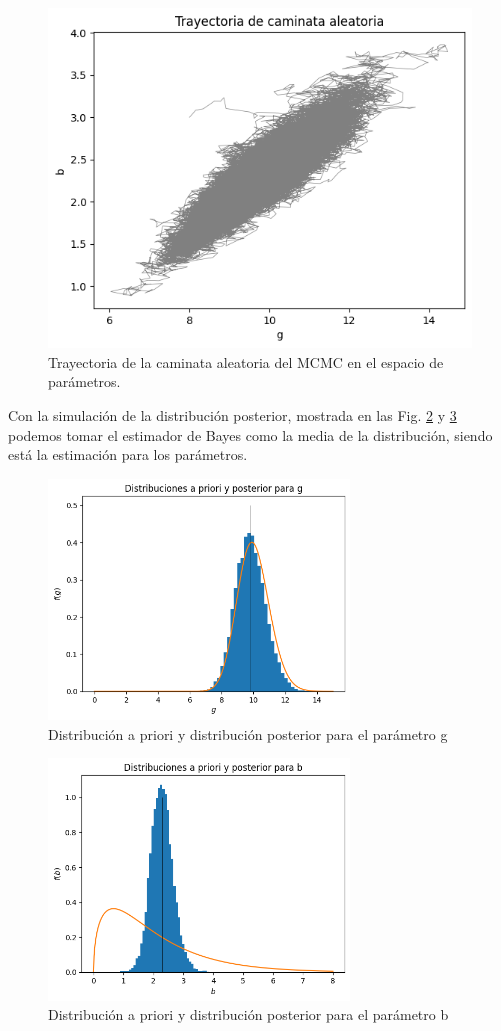 \documentclass{article}
\begin{document}
\begin{figure}[H]
    \centering 
    \includegraphics[width = 8 cm]{Figures/trayectoria.png} 
    \caption{Trayectoria de la caminata aleatoria del MCMC en el espacio de parámetros.}
    \label{Fig. 02}
\end{figure} 

Con la simulación de la distribución posterior, mostrada en las Fig. \ref{Fig. 3.03} y \ref{Fig. 3.04} podemos tomar el estimador de Bayes como la media de la distribución, siendo está la estimación para los parámetros.

\begin{figure}[H]
    \centering 
    \includegraphics[width = 8cm ]{Figures/g.png}    
    \caption{Distribución a priori y distribución posterior para el parámetro g}
    \label{Fig. 3.03}
\end{figure} 


\begin{figure}[H]
    \centering 
    \includegraphics[width = 8cm ]{Figures/b.png}    
    \caption{Distribución a priori y distribución posterior para el parámetro b}
    \label{Fig. 3.04}
\end{figure} 
\end{document}
